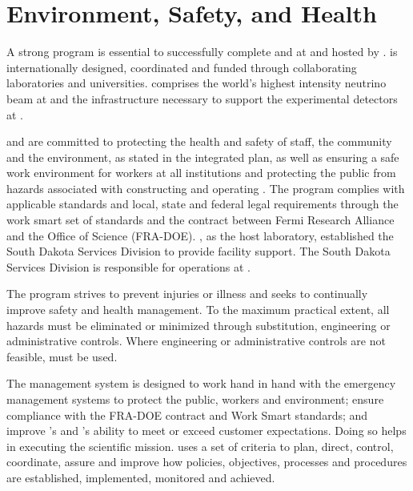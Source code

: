 \chapter{Environment, Safety, and Health}
\label{vl:tc-ESH}


A strong  program is essential to successfully complete
 and  at  and hosted by
\fnal.   is internationally designed,
coordinated and funded through collaborating laboratories and
universities.   comprises the
world's highest intensity neutrino beam at \fnal and the
infrastructure necessary to support the experimental detectors at
. 

\fnal and  are committed to protecting the health and
safety of staff, the community and the environment, as stated in the
 integrated  plan, as well as ensuring a
safe work environment for  workers at all institutions and
protecting the public from hazards associated with constructing and
operating .
The  program
complies with applicable standards and local, state and federal legal
requirements through the \fnal work smart set of standards and the
contract between Fermi Research Alliance and the  Office of
Science (FRA-DOE). \fnal, as the host laboratory, established the
South Dakota Services Division to provide facility support.  The South
Dakota Services Division is responsible for 
operations at .

The   program strives to prevent
injuries or illness and seeks to continually improve safety and health
management.  To the maximum practical extent, all hazards must be
eliminated or minimized through substitution, engineering or
administrative controls.  Where engineering or administrative controls
are not feasible,  must be used.

The   management system is
designed to work hand in hand with the  emergency
management systems to protect the public, workers and environment;
ensure compliance with the FRA-DOE contract and \fnal Work Smart
standards; and improve \fnal's and 's ability to meet or
exceed customer expectations. Doing so helps in executing the
scientific mission.  \fnal uses a set of criteria to plan, direct,
control, coordinate, assure and improve how  policies,
objectives, processes and procedures are established, implemented,
monitored and achieved.

